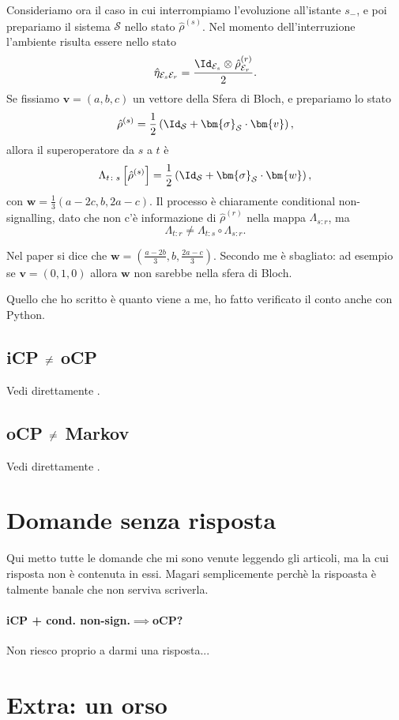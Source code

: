 \documentclass[a4]{article}
\begin{document}
Consideriamo ora il caso in cui interrompiamo l'evoluzione all'istante \(s_-\), e poi
prepariamo il sistema \(\mathcal{S}\) nello stato \(\hat{\rho}^{(s)}\). Nel momento
dell'interruzione l'ambiente risulta essere nello stato
\[\hat{\eta}_{\mathcal{E}_s\mathcal{E}_r} =
      \frac{\Id_{\mathcal{E}_s}\otimes\hat{\rho}^{(r)}_{\mathcal{E}_r}}{2}.\]
Se fissiamo \(\bm{v} = (a,b,c)\) un vettore della Sfera di Bloch, e prepariamo lo
stato 
\[\hat{\rho}^{(s)} =
     \frac{1}{2} \left( \Id_\mathcal{S} + \bm{\sigma}_\mathcal{S} \cdot \bm{v} \right),\]
allora il superoperatore da \(s\) a \(t\) è 
\[\Lambda_{t\colon s} \left[\hat{\rho}^{(s)}\right] =
     \frac{1}{2} \left( \Id_\mathcal{S} + \bm{\sigma}_\mathcal{S} \cdot \bm{w} \right),\]
con \(\bm{w} = \frac{1}{3} (a-2c, b, 2a-c)\). Il processo è chiaramente conditional
non-signalling, dato che non c'è informazione di \(\hat{\rho}^{(r)}\) nella mappa
\(\Lambda_{s\colon r}\), ma 
\[\Lambda_{t\colon r} \not= \Lambda_{t\colon s} \circ \Lambda_{s\colon r}.\]
\begin{tcolorbox}[colback=red!5!white,colframe=red!75!black,title=Attenzione!]
	Nel paper \cite{CPdoesnotimply} si dice che 
	\(\bm{w} = (\frac{a-2b}{3}, b, \frac{2a-c}{3})\). Secondo me è sbagliato: 
	ad esempio se \(\bm{v} = (0,1,0)\) allora \(\bm{w}\) non sarebbe nella
	sfera di Bloch.
	
	Quello che ho scritto è quanto viene a me, ho fatto verificato
	il conto anche con Python.
\end{tcolorbox}

\subsection[iCP non è equivalente a oCP]
           {iCP \(\centernot=\) oCP} \label{cont:icpocp}
Vedi direttamente \cite{CPdoesnotimply}.

\subsection[oCP non è equivalente a Markoviano]
           {oCP \(\centernot=\) Markov} \label{cont:ocpmar}
Vedi direttamente \cite{CPdoesnotimply}.

\section{Domande senza risposta}
Qui metto tutte le domande che mi sono venute leggendo gli articoli, ma la cui risposta
non è contenuta in essi. Magari semplicemente perchè la rispoasta è talmente
banale che non serviva scriverla.
\paragraph{iCP + cond. non-sign.\(\implies\)oCP?} 
Non riesco proprio a darmi una risposta...

\printbibliography

\section{Extra: un orso}
\resizebox{\textwidth}{!}{}
	
\end{document}
